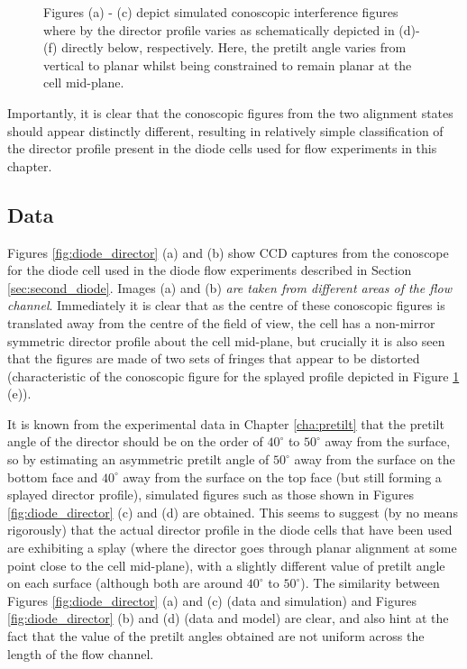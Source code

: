 \begin{figure}
\begin{center}
\end{center}
\caption[Simulated conoscopic figures - director planar at mid-plane]{\label{fig:planar_middle} Figures (a) - (c) depict simulated conoscopic interference figures where by the director profile varies as schematically depicted in (d)-(f) directly below, respectively. Here, the pretilt angle varies from vertical to planar whilst being constrained to remain planar at the cell mid-plane.}
\end{figure}

Importantly, it is clear that the conoscopic figures from the two alignment states should appear distinctly different, resulting in relatively simple classification of the director profile present in the diode cells used for flow experiments in this chapter.

\subsection{Data}
Figures \ref{fig:diode_director} (a) and (b) show CCD captures from the conoscope for the diode cell used in the diode flow experiments described in Section \ref{sec:second_diode}. Images (a) and (b) \textit{are taken from different areas of the flow channel}. Immediately it is clear that as the centre of these conoscopic figures is translated away from the centre of the field of view, the cell has a non-mirror symmetric director profile about the cell mid-plane, but crucially it is also seen that the figures are made of two sets of fringes that appear to be distorted (characteristic of the conoscopic figure for the splayed profile depicted in Figure \ref{fig:planar_middle} (e)). 

It is known from the experimental data in Chapter \ref{cha:pretilt} that the pretilt angle of the director should be on the order of $40^{\circ}$ to $50^{\circ}$ away from the surface, so by estimating an asymmetric pretilt angle of $50^{\circ}$ away from the surface on the bottom face and $40^{\circ}$ away from the surface on the top face (but still forming a splayed director profile), simulated figures such as those shown in Figures \ref{fig:diode_director} (c) and (d) are obtained. This seems to suggest (by no means rigorously) that the actual director profile in the diode cells that have been used are exhibiting a splay (where the director goes through planar alignment at some point close to the cell mid-plane), with a slightly different value of pretilt angle on each surface (although both are around $40^{\circ}$ to $50^{\circ}$). The similarity between Figures \ref{fig:diode_director} (a) and (c) (data and simulation) and Figures \ref{fig:diode_director} (b) and (d) (data and model) are clear, and also hint at the fact that the value of the pretilt angles obtained are not uniform across the length of the flow channel.

